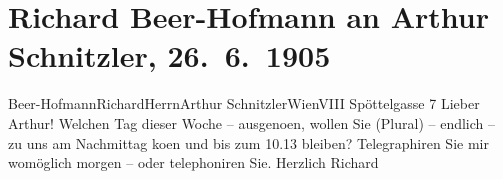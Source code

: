 

         
         \renewcommand{\erwaehntePersonen}{Personen: Richard Beer-Hofmann}
         \renewcommand{\erwaehnteOrte}{Orte: Edmund-Weiß-Gasse 7, I., Innere Stadt, Wien, XVIII., Währing}
         \renewcommand{\erwaehnteWerke}{}
               \section[Richard Beer-Hofmann an Arthur Schnitzler, 26. 6. 1905]{ Richard Beer-Hofmann an Arthur Schnitzler, 26. 6. 1905}\nopagebreak{}\rehead{ }\begin{ledgroupsized}[t]{13cm}\normalsize\beginnumbering \toendnotes[C]{\smallbreak\pagebreak[2]} 
\toendnotes[C]{\smallbreak}\pstart{}{\pb}Beer-Hofmann\pend{}\pstart{}Richard\pend{}{\bigskip}\pstart{}Herrn\pend{}\pstart{}Arthur Schnitzler\pend{}\pstart{}Wien\pend{}\pstart{}VIII Spöttelgasse 7\pend{}{\bigskip}\pstart
           \noindent{}{\pb}Lieber Arthur! Welchen Tag dieser Woche – \label{K_L01527-1v}\label{K_L01527-1h}
                  ausgeno{\geminationm}en, wollen Sie (Plural) – endlich –  zu uns am Nachmittag ko{\geminationm}en und bis zum 10.13 bleiben?
               Telegraphiren Sie mir womöglich morgen – oder telephoniren Sie.
               Herzlich\pend
           \pstart
           \spacefill\mbox{Richard}\pend
           
         
         \endnumbering{}\end{ledgroupsized}  \newcommand{\dateiname}{L01527}\newcommand{\titel}{Richard Beer-Hofmann an Arthur Schnitzler, 26. 6. 1905}\newcommand{\editorInnen}{Martin Anton Müller und Gerd-Hermann Susen}
      
